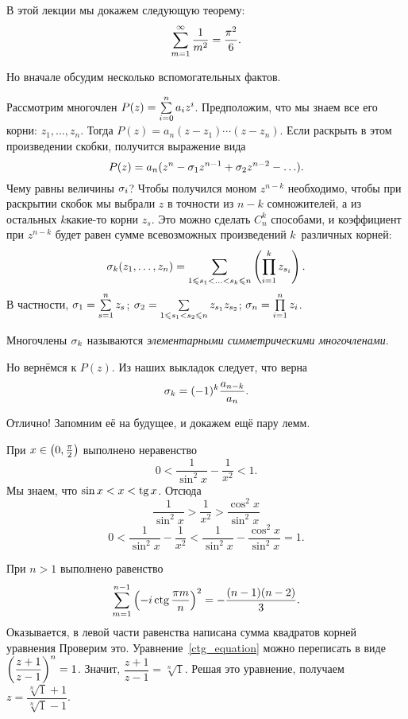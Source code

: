 \documentclass[a4paper,12pt,fleqn]{article}
\begin{document}
\vspace*{-1.7cm}

В этой лекции мы докажем следующую теорему:
\label{main}
\[
\sum\limits_{{m=1}}^{{\infty}} \frac{1}{m^2} = \frac{\pi^2}{6}.
\]

Но вначале обсудим несколько вспомогательных фактов. 

Рассмотрим многочлен $P(z) = \sum\limits_{{i=0}}^{{n}}a_i z^i$. Предположим, что мы знаем все его корни: $z_1, \ldots, z_n$. Тогда $P(z) = a_n(z-z_1)\cdots(z-z_n)$. Если раскрыть в этом произведении скобки, получится выражение вида
\[
P(z) = a_n(z^n - \sigma_1 z^{n-1} + \sigma_2 z^{n-2} - \ldots).
\]
Чему равны величины $\sigma_i$? Чтобы получился моном $z^{n-k}$ необходимо, чтобы при раскрытии скобок мы выбрали $z$ в точности из $n-k$ сомножителей, а из остальных $k$\т какие-то корни $z_s$. Это можно сделать $C_n^k$ способами, и коэффициент при $z^{n-k}$ будет равен сумме всевозможных произведений $k$~различных корней:
\[
\sigma_k(z_1, \ldots, z_n) = \sum\limits_{{1 \leqslant s_1 < \ldots < s_k \leqslant n}} \left(\prod\limits_{{i=1}}^{{k}} z_{s_i}\right).
\]
В частности, $\sigma_1 = \sum\limits_{{s = 1}}^{{n}}z_s$; $\sigma_2 = \sum\limits_{{1 \leqslant s_1 < s_2 \leqslant n}}z_{s_1}z_{s_2}$; $\sigma_n = \prod\limits_{{i=1}}^{{n}}z_i$.

Многочлены $\sigma_k$ называются \emph{элементарными симметрическими многочленами}.

Но вернёмся к $P(z)$. Из наших выкладок следует, что верна
\[
\sigma_k = (-1)^k\dfrac{a_{n-k}}{a_n}.
\]

Отлично! Запомним её на будущее, и докажем ещё пару лемм.
\bigskip

\label{sin}
При $x \in \left(0, \frac{\pi}2\right)$ выполнено неравенство
\[
0 < \frac1{\sin^2 x} - \frac1{x^2} < 1.
\]
Мы знаем, что $\sin x < x < \tg x$. Отсюда
\[
\frac1{\sin^2 x} > \frac1{x^2} > \frac{\cos^2 x}{\sin^2 x}
\]
\[
0 < \frac1{\sin^2 x} - \frac1{x^2} < \frac1{\sin^2 x} - \frac{\cos^2 x}{\sin^2 x} = 1.
\]

\label{ctg}
При $n > 1$ выполнено равенство
\[
\suml{m=1}{n-1} \hr{-i \ctg\frac{\pi m}{n}}^2 = -\frac{(n-1)(n-2)}3.
\]
Оказывается, в левой части равенства написана сумма квадратов корней уравнения
Проверим это. Уравнение~\ref{ctg_equation} можно переписать в виде $\left(\dfrac{z+1}{z-1}\right)^n = 1$. Значит, $\dfrac{z+1}{z-1} = \sqrt[n]{1}$. Решая это уравнение, получаем $z = \dfrac{\sqrt[n]{1} + 1}{\sqrt[n]{1} - 1}$.
\end{document}
